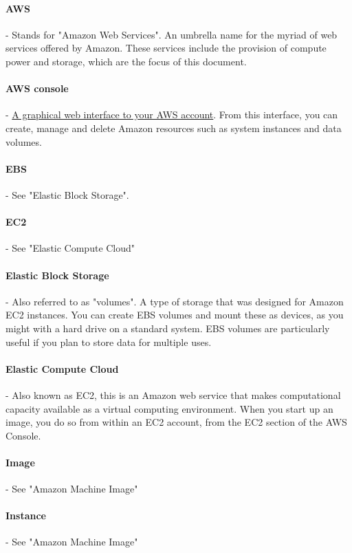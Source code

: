 \paragraph{AWS} - Stands for "Amazon Web Services". An umbrella name for the myriad of web services offered by Amazon. These services include the provision of compute power and storage, which are the focus of this document.

\paragraph{AWS console} - \href{http://aws.amazon.com/console/}{A graphical web interface to your AWS account}. From this interface, you can create, manage and delete Amazon resources such as system instances and data volumes.

\paragraph{EBS} - See "Elastic Block Storage".

\paragraph{EC2} - See "Elastic Compute Cloud"  

\paragraph{Elastic Block Storage} - Also referred to as "volumes". A type of storage that was designed for Amazon EC2 instances. You can create EBS volumes and mount these as devices, as you might with a hard drive on a standard system. EBS volumes are particularly useful if you plan to store data for multiple uses.

\paragraph{Elastic Compute Cloud} - Also known as EC2, this is an Amazon web service that makes computational capacity available as a virtual computing environment. When you start up an image, you do so from within an EC2 account, from the EC2 section of the AWS Console. 

\paragraph{Image} - See "Amazon Machine Image"

\paragraph{Instance} - See "Amazon Machine Image"

